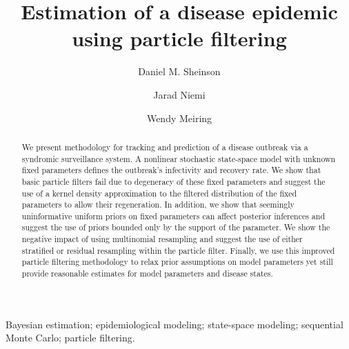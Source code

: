 \documentclass{elsarticle}
\begin{document}
\begin{frontmatter}

\title{Estimation of a disease epidemic using particle filtering}

\author[danny]{Daniel M. Sheinson}
\author[jarad]{Jarad Niemi}
\author[wendy]{Wendy Meiring}

\address[danny]{Corresponding author -- Department of Statistics and Applied Probability, University of California--Santa Barbara, \\
 Santa Barbara, CA 93106, U.S.A., sheinson@pstat.ucsb.edu, 1-847-609-7824}
 \address[jarad]{Department of Statistics, Iowa State University, Ames, IA 50011, U.S.A., niemi@iastate.edu}
 \address[wendy]{Department of Statistics and Applied Probability, University of California--Santa Barbara, \\
 Santa Barbara, CA 93106, U.S.A., meiring@pstat.ucsb.edu}

\begin{abstract}
We present methodology for tracking and prediction of a disease outbreak via a syndromic surveillance system. A nonlinear stochastic state-space model with unknown fixed parameters defines the outbreak's infectivity and recovery rate. We show that basic particle filters fail due to degeneracy of these fixed parameters and suggest the use of a kernel density approximation to the filtered distribution of the fixed parameters to allow their regeneration. In addition, we show that seemingly uninformative uniform priors on fixed parameters can affect posterior inferences and suggest the use of priors bounded only by the support of the parameter. We show the negative impact of using multinomial resampling and suggest the use of either stratified or residual resampling within the particle filter. Finally, we use this improved particle filtering methodology to relax prior assumptions on model parameters yet still provide reasonable estimates for model parameters and disease states.
\end{abstract}


\begin{keyword}
Bayesian estimation; epidemiological modeling; state-space modeling; sequential Monte Carlo; particle filtering.
\end{keyword}

\end{frontmatter}

\let\thefootnote\relax{}
\end{document}
